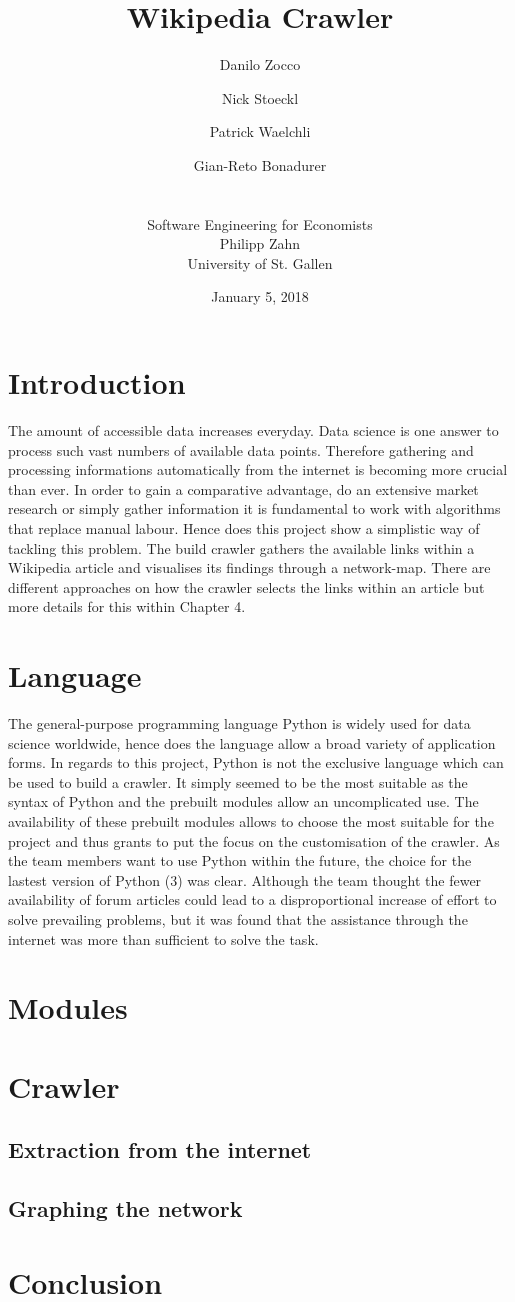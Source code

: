 \documentclass[10pt]{article}
\title{Wikipedia Crawler}
\author{Danilo Zocco\\ 
	\and Nick Stoeckl\\ 	
	\and Patrick Waelchli\\ 
	\and Gian-Reto Bonadurer\\ 
	\\ \\
	\small Software Engineering for Economists\\
	\small Philipp Zahn\\
	\small University of St. Gallen}
\date{January 5, 2018}
\begin{document}
\maketitle
\newpage


\tableofcontents

\newpage

\section{Introduction}

The amount of accessible data increases everyday. Data science is one answer to process such vast numbers of available data points. Therefore gathering and processing informations automatically from 
the internet is becoming more crucial than ever. In order to gain a comparative advantage, do an extensive market research or simply gather information it is fundamental to work with algorithms that replace manual labour. 
Hence does this project show a simplistic way of tackling this problem. The build crawler gathers the available links within a Wikipedia article and visualises its findings through a network-map. 
There are different approaches on how the crawler selects the links within an article but more details for this within Chapter 4.

\section{Language}

The general-purpose programming language Python is widely used for data science worldwide, hence does the language allow a broad variety of application forms. In regards to this project, Python is not the exclusive language which can be used to build a crawler. It simply seemed to be the most suitable as the syntax of Python and the prebuilt modules allow an uncomplicated use. The availability of these prebuilt modules allows to choose the most suitable for the project and thus grants to put the focus on the customisation of the crawler. As the team members want to use Python within the future, the choice for the lastest version of Python (3) was clear. Although the team thought the fewer availability of forum articles could lead to a disproportional increase of effort to solve prevailing problems, but it was found that the assistance through the internet was more than sufficient to solve the task. 


\section{Modules}
\section{Crawler}
\subsection{Extraction from the internet}
\subsection{Graphing the network}
\section{Conclusion}



% 
%
\end{document}
